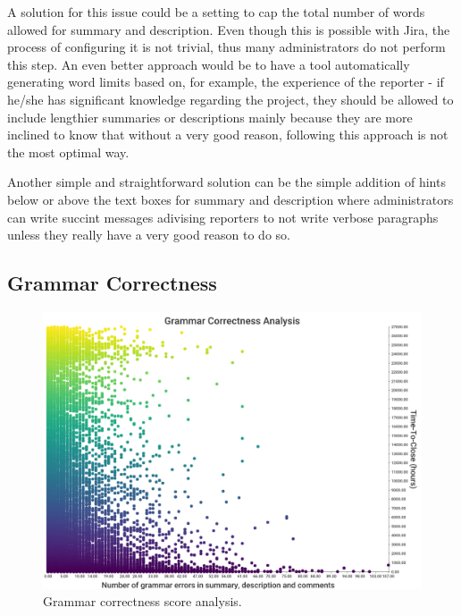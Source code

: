 \documentclass{mpaper}
\begin{document}
A solution for this issue could be a setting to cap the total number of words allowed for summary and 
description. Even though this is possible with Jira, the process of configuring it is not trivial, thus many 
administrators do not perform this step. An even better approach would be to have a tool automatically generating 
word limits based on, for example, the experience of the reporter - if he/she has significant knowledge regarding 
the project, they should be allowed to include lengthier summaries or descriptions mainly because they are more inclined 
to know that without a very good reason, following this approach is not the most optimal way. 

Another simple and straightforward solution can be the simple addition of hints below or above the text boxes for summary 
and description where administrators can write succint messages adivising reporters to not write verbose paragraphs 
unless they really have a very good reason to do so.

\vskip10pt

\subsection{Grammar Correctness}

\begin{figure}[ht]
  \begin{center}
    \includegraphics[scale=0.18]{images/grammar_correctness.png}
  \end{center}
  \caption{\label{grammar}Grammar correctness score analysis.}
\end{figure}
\end{document}
